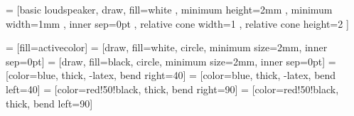 
 = [basic loudspeaker, draw, fill=white
, minimum height=2mm 	    %
, minimum width=1mm		    %
, inner sep=0pt
, relative cone width=1	%
, relative cone height=2	    %
]

 = [fill=activecolor]
 = [draw, fill=white, circle, minimum size=2mm, inner sep=0pt]
 = [draw, fill=black, circle, minimum size=2mm, inner sep=0pt]
 = [color=blue, thick, -latex, bend right=40]
 = [color=blue, thick, -latex, bend left=40]
 = [color=red!50!black, thick, bend right=90]
 = [color=red!50!black, thick, bend left=90]

